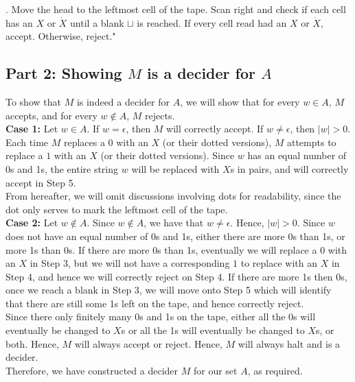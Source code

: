 \documentclass[12pt]{article}
\begin{document}
. Move the head to the leftmost cell of the tape. Scan right and check if each cell has an $X$ or $\Dot{X}$ until a blank $\sqcup$ is reached. If every cell read had an $X$ or $\Dot{X}$, accept. Otherwise, reject."  

\setlength\parindent{0pt}

\subsection*{Part 2: Showing $M$ is a decider for $A$}

To show that $M$ is indeed a decider for $A$, we will show that for every $w \in A$, $M$ accepts, and for every $w \not \in A$, $M$ rejects. \\

\textbf{Case 1:} Let $w \in A$. If $w = \epsilon$, then $M$ will correctly accept. If $w \neq \epsilon$, then $|w| > 0$. Each time $M$ replaces a 0 with an $X$ (or their dotted versions), $M$ attempts to replace a $1$ with an $X$ (or their dotted versions). Since $w$ has an equal number of 0s and 1s, the entire string $w$ will be replaced with $X$s in pairs, and will correctly accept in Step 5. \\

From hereafter, we will omit discussions involving dots for readability, since the dot only serves to mark the leftmost cell of the tape. \\

\textbf{Case 2:} Let $w \not \in A$. Since $w \not \in A$, we have that $w \neq \epsilon$. Hence, $|w| > 0$. Since $w$ does not have an equal number of 0s and 1s, either there are more 0s than 1s, or more 1s than 0s. If there are more 0s than 1s, eventually we will replace a $0$ with an $X$ in Step 3, but we will not have a corresponding $1$ to replace with an $X$ in Step 4, and hence we will correctly reject on Step 4. If there are more 1s then 0s, once we reach a blank in Step 3, we will move onto Step 5 which will identify that there are still some 1s left on the tape, and hence correctly reject. \\

Since there only finitely many 0s and 1s on the tape, either all the 0s will eventually be changed to $X$s or all the 1s will eventually be changed to $X$s, or both. Hence, $M$ will always accept or reject. Hence, $M$ will always halt and is a decider. \\

Therefore, we have constructed a decider $M$ for our set $A$, as required. 
\end{document}
